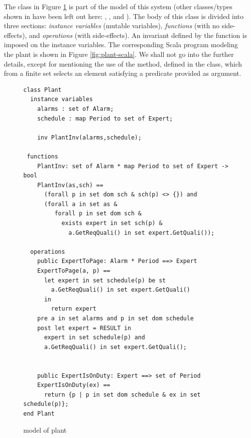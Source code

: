The \vdmpp{} class  in Figure \ref{fig:plant-vdm} 
is part of the model of this system (other classes/types shown in
\cite{vdmplusplus05} have been left out here: 
, , and ).
The body of this class is divided into three sections: {\em 
instance variables} (mutable variables), {\em functions} (with no 
side-effects), and {\em operations} (with side-effects). An 
invariant defined by the function  is imposed on 
the instance variables. The corresponding Scala program modeling the plant is shown in Figure \ref{fig:plant-scala}. We shall not go into the further details, except for mentioning the use of the
 method, defined in the  class, 
which from a finite set selects an element satisfying a predicate provided as argument.

\begin{figure}
\begin{lstlisting}[language=vdm,frame=single,backgroundcolor=\color{light-gray}]
class Plant
  instance variables
    alarms : set of Alarm;
    schedule : map Period to set of Expert;
    
    inv PlantInv(alarms,schedule);

 functions
    PlantInv: set of Alarm * map Period to set of Expert -> bool
    PlantInv(as,sch) ==
      (forall p in set dom sch & sch(p) <> {}) and
      (forall a in set as &
         forall p in set dom sch & 
           exists expert in set sch(p) &
             a.GetReqQuali() in set expert.GetQuali());

  operations
    public ExpertToPage: Alarm * Period ==> Expert
    ExpertToPage(a, p) ==
      let expert in set schedule(p) be st
        a.GetReqQuali() in set expert.GetQuali()
      in
        return expert
    pre a in set alarms and p in set dom schedule
    post let expert = RESULT in
      expert in set schedule(p) and
      a.GetReqQuali() in set expert.GetQuali();
		
		 
    public ExpertIsOnDuty: Expert ==> set of Period
    ExpertIsOnDuty(ex) ==
      return {p | p in set dom schedule & ex in set schedule(p)};
end Plant
\end{lstlisting}
\caption{\vdmpp{} model of plant}
\label{fig:plant-vdm}
\end{figure}

